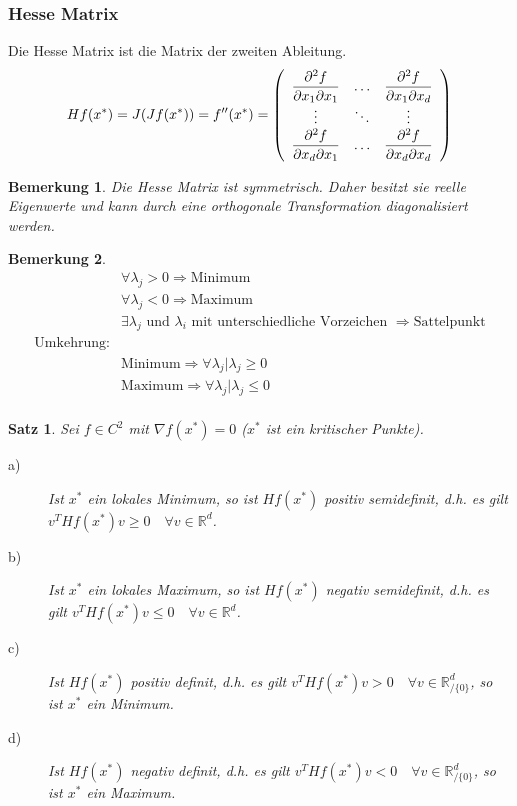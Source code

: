 \documentclass[12pt,a4paper]{report}%
\newtheorem{satz}{Satz}[section]
\newtheorem{bem}{Bemerkung}[section]
\numberwithin{equation}{section}
\newcommand{\R}{\mathbb{R}} %
\newcommand{\diffp}{\partial}
\numberwithin{equation}{subsection}
\begin{document}
  \subsubsection{Hesse Matrix}
  Die Hesse Matrix ist die Matrix der zweiten Ableitung.
  \begin{equation}
    Hf(x^*) = J(Jf(x^*)) = f''(x^*) = \left(\begin{array}{c c c} 
    \displaystyle \frac{\diffp^2f}{\diffp x_1 \diffp x_1} & \dots & \displaystyle\frac{\diffp^2 f}{\diffp x_1 \diffp x_d} \\
    \vdots & \ddots & \vdots \\
    \displaystyle\frac{\diffp^2 f}{\diffp x_d \diffp x_1} & \dots & \displaystyle\frac{\diffp^2 f}{\diffp x_d \diffp x_d} \end{array} \right)
  \end{equation}
  \begin{bem}
    Die Hesse Matrix ist symmetrisch. Daher besitzt sie reelle Eigenwerte und kann durch eine orthogonale Transformation diagonalisiert werden.
  \end{bem}
  \begin{bem}
    \begin{align}
      &\forall \lambda_j > 0 \Rightarrow \text{Minimum} \nonumber \\
      &\forall \lambda_j < 0 \Rightarrow \text{Maximum} \nonumber \\
      &\exists \lambda_j \text{ und } \lambda_i \text{ mit unterschiedliche Vorzeichen } \Rightarrow \text{Sattelpunkt} \nonumber \\
      \text{Umkehrung:} \nonumber \\
      &\text{Minimum} \Rightarrow \forall \lambda_j| \lambda_j \geq 0 \nonumber \\
      &\text{Maximum} \Rightarrow \forall \lambda_j| \lambda_j \leq 0 \nonumber \\ \label{eq:definitheit_ew}
    \end{align}
  \end{bem}
  \begin{satz}
    Sei $f \in C^2$ mit $\nabla f(x^*) = 0$ ($x^*$ ist ein kritischer Punkte).
    \begin{description}
      \item[a)] Ist $x^*$ ein lokales Minimum, so ist $Hf(x^*)$ positiv semidefinit, d.h. es gilt $v^T Hf(x^*)v \geq 0\quad \forall v \in \R^d$.
      \item[b)] Ist $x^*$ ein lokales Maximum, so ist $Hf(x^*)$ negativ semidefinit, d.h. es gilt $v^T Hf(x^*)v \leq 0\quad \forall v \in \R^d$.
      \item[c)] Ist $Hf(x^*)$ positiv definit, d.h. es gilt $v^T Hf(x^*)v > 0\quad \forall v \in \R^d_{/\lbrace 0 \rbrace}$, so ist $x^*$ ein Minimum.
      \item[d)] Ist $Hf(x^*)$ negativ definit, d.h. es gilt $v^T Hf(x^*)v < 0\quad \forall v \in \R^d_{/\lbrace 0 \rbrace}$, so ist $x^*$ ein Maximum.
    \end{description} \label{satz:definitheit_1}
  \end{satz}
  
\end{document}
